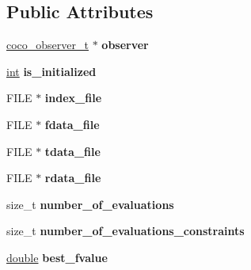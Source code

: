 \subsection*{Public Attributes}
\begin{DoxyCompactItemize}
\item 
\hyperlink{structcoco__observer__s}{coco\+\_\+observer\+\_\+t} $\ast$ {\bfseries observer}\hypertarget{structlogger__bbob__data__t_a4440d48dd5831be30fdad384b2edf500}{}\label{structlogger__bbob__data__t_a4440d48dd5831be30fdad384b2edf500}

\item 
\hyperlink{classint}{int} {\bfseries is\+\_\+initialized}\hypertarget{structlogger__bbob__data__t_a31a97d33684f2b716d9b818b14b6defb}{}\label{structlogger__bbob__data__t_a31a97d33684f2b716d9b818b14b6defb}

\item 
F\+I\+LE $\ast$ {\bfseries index\+\_\+file}\hypertarget{structlogger__bbob__data__t_a6d2fe18de5edf9edf7824726576c9c9f}{}\label{structlogger__bbob__data__t_a6d2fe18de5edf9edf7824726576c9c9f}

\item 
F\+I\+LE $\ast$ {\bfseries fdata\+\_\+file}\hypertarget{structlogger__bbob__data__t_a4e6f8a5fc95b588c25fd255caf8c4a97}{}\label{structlogger__bbob__data__t_a4e6f8a5fc95b588c25fd255caf8c4a97}

\item 
F\+I\+LE $\ast$ {\bfseries tdata\+\_\+file}\hypertarget{structlogger__bbob__data__t_a662e56f3930852032bc80d577a915b0c}{}\label{structlogger__bbob__data__t_a662e56f3930852032bc80d577a915b0c}

\item 
F\+I\+LE $\ast$ {\bfseries rdata\+\_\+file}\hypertarget{structlogger__bbob__data__t_aff0e60531de4ee2a13627aa15c239bbf}{}\label{structlogger__bbob__data__t_aff0e60531de4ee2a13627aa15c239bbf}

\item 
size\+\_\+t {\bfseries number\+\_\+of\+\_\+evaluations}\hypertarget{structlogger__bbob__data__t_ae0d88d4780c265a6203be3f5a4443e72}{}\label{structlogger__bbob__data__t_ae0d88d4780c265a6203be3f5a4443e72}

\item 
size\+\_\+t {\bfseries number\+\_\+of\+\_\+evaluations\+\_\+constraints}\hypertarget{structlogger__bbob__data__t_a73345d4279f34f35f530543f3bfd630a}{}\label{structlogger__bbob__data__t_a73345d4279f34f35f530543f3bfd630a}

\item 
\hyperlink{classdouble}{double} {\bfseries best\+\_\+fvalue}\hypertarget{structlogger__bbob__data__t_a20f1f024b56ee2abe9adfa0af203fa23}{}\label{structlogger__bbob__data__t_a20f1f024b56ee2abe9adfa0af203fa23}


\end{DoxyCompactItemize}
